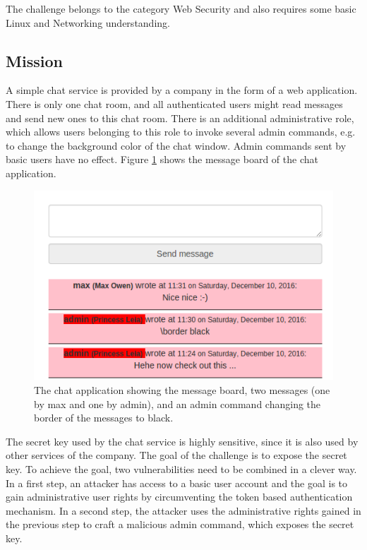 \documentclass[12pt,a4paper]{article}
\begin{document}
The challenge belongs to the category Web Security and also requires some basic Linux and Networking understanding.

\subsection{Mission}

A simple chat service is provided by a company in the form of a web application. There is only one chat room, and all authenticated users might read messages and send new ones to this chat room. There is an additional administrative role, which allows users belonging to this role to invoke several admin commands, e.g. to change the background color of the chat window. Admin commands sent by basic users have no effect. Figure \ref{fig:chatapp} shows the message board of the chat application.


\begin{figure}
	\centering
	\includegraphics[scale=0.7]{chatapp.png}
	\caption{The chat application showing the message board, two messages (one by max and one by admin), and an admin command changing the border of the messages to black.}
	\label{fig:chatapp}
\end{figure}

The secret key used by the chat service is  highly sensitive, since it is also used by other services of the company. The goal of the challenge is to expose the secret key.
To achieve the goal, two vulnerabilities need to be combined in a clever way.
In a first step, an attacker has access to a basic user account and the goal is to gain administrative user rights by circumventing the token based authentication mechanism.
In a second step, the attacker uses the administrative rights gained in the previous step to craft a malicious admin command, which exposes the secret key.
\end{document}
